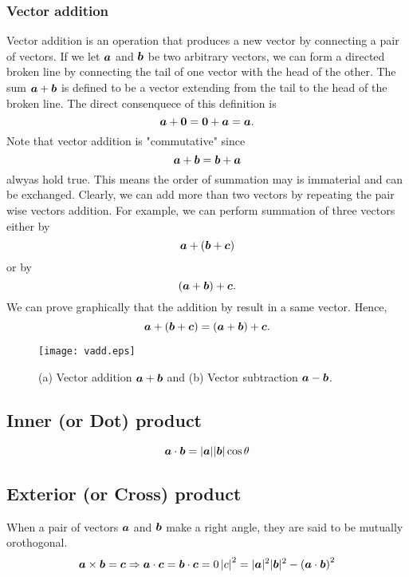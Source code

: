\documentclass[10pt,a4j]{article}
\begin{document}
\subsubsection{Vector addition}
Vector addition is an operation that produces a new vector by connecting a pair of vectors. 
If we let $\mbox{\boldmath $a$}$ and $\mbox{\boldmath $b$}$ be two arbitrary vectors, 
we can form a directed broken line by connecting the tail of one vector with 
the head of the other. The sum $\mbox{\boldmath $a$}+\mbox{\boldmath $b$}$ is defined to be a vector 
extending from the tail to the head of the broken line.
The direct consenquece of this definition is 
\begin{equation}
	\mbox{\boldmath $a$}+\mbox{\boldmath $0$} = \mbox{\boldmath $0$}+\mbox{\boldmath $a$}=\mbox{\boldmath $a$}. 
\end{equation}
Note that vector addition is "commutative" since 
\[
	\mbox{\boldmath $a$}+\mbox{\boldmath $b$}=\mbox{\boldmath $b$}+\mbox{\boldmath $a$}
\]
alwyas hold true. This means the order of summation may is immaterial and can be 
exchanged. Clearly, we can add more than two vectors by repeating the pair wise vectors addition.
For example, we can perform summation of three vectors either by 
\[
	\mbox{\boldmath $a$}+\left( \mbox{\boldmath $b$}+\mbox{\boldmath $c$} \right)
\]
or by 
\[
	\left( \mbox{\boldmath $a$}+\mbox{\boldmath $b$} \right) + \mbox{\boldmath $c$}.
\]
We can prove graphically that the addition by result in a same vector. Hence, 
\begin{equation}
	\mbox{\boldmath $a$}+\left( \mbox{\boldmath $b$}+\mbox{\boldmath $c$} \right)
	=
	\left( \mbox{\boldmath $a$}+\mbox{\boldmath $b$} \right) + \mbox{\boldmath $c$}.
\end{equation}
\begin{figure}[h]
	\begin{center}
	\texttt{[image: vadd.eps]} 
	\end{center}
	\caption{(a) Vector addition $\mbox{\boldmath $a$}+\mbox{\boldmath $b$}$ and 
	(b) Vector subtraction $\mbox{\boldmath $a$}-\mbox{\boldmath $b$}$.} 
	\label{fig:1_4}
\end{figure}
\subsection{Inner (or Dot) product} 
\[
	\mbox{\boldmath $a$}\cdot\mbox{\boldmath $b$}=|\mbox{\boldmath $a$}||\mbox{\boldmath $b$}|\cos\theta
\]
\subsection{Exterior (or Cross) product} 
When a pair of vectors $\mbox{\boldmath $a$}$ and $\mbox{\boldmath $b$}$ make a right 
angle, they are said to be mutually orothogonal.  
\[
	\mbox{\boldmath $a$}\times \mbox{\boldmath $b$}= \mbox{\boldmath $c$}
	\Rightarrow
	\mbox{\boldmath $a$}\cdot\mbox{\boldmath $c$}=\mbox{\boldmath $b$}\cdot\mbox{\boldmath $c$}=0
	\left|c\right|^2=|\mbox{\boldmath $a$}|^2|\mbox{\boldmath $b$}|^2-\left(\mbox{\boldmath $a$}\cdot\mbox{\boldmath $b$}\right)^2
\]
\end{document}
